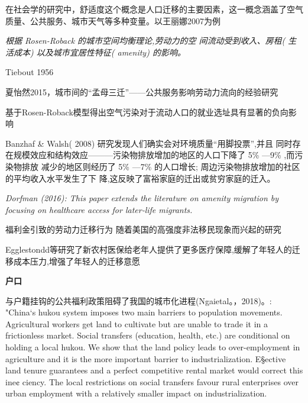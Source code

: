 \documentclass[a4paper,12pt,oneside]{book} %
\begin{document}
在社会学的研究中，舒适度这个概念是人口迁移的主要因素，这一概念涵盖了空气质量、公共服务、城市天气等多种变量。以王丽娜2007为例

\textit{根据 Rosen-Roback 的城市空间均衡理论,劳动力的空 间流动受到收入、房租( 生活成本) 以及城市宜居性特征( amenity) 的影响。}

Tiebout 1956

夏怡然2015，城市间的“孟母三迁”——公共服务影响劳动力流向的经验研究
\cite{XiaYiRanChengShiJianDeMengMuSanQianGongGongFuWuYingXiangLaoDongLiLiuXiangDeJingYanYanJiu2015}

\cite{SunWeiZengKongQiWuRanYuLaoDongLiDeKongJianLiuDongJiYuLiuDongRenKouJiuYeXuanZhiXingWeiDeYanJiu2019}
基于Rosen-Roback模型得出空气污染对于流动人口的就业选址具有显著的负向影响

Banzhaf \& Walsh( 2008) 研究发现人们确实会对环境质量“用脚投票”,并且 同时存在规模效应和结构效应———污染物排放增加的地区的人口下降了 5\% —9\% ,而污染物排放 减少的地区则经历了 5\% —7\% 的人口增长; 周边污染物排放增加的社区的平均收入水平发生了下 降,这反映了富裕家庭的迁出或贫穷家庭的迁入。


\textit{Dorfman (2016): This paper extends the literature on amenity migration by focusing on healthcare access for later‐life migrants.}


福利金引致的劳动力迁移行为
\cite{benjaminImportingPoorWelfare2004}
\cite{mckinnishWelfareinducedMigrationState2007}
随着美国的高强度非法移民现象而兴起的研究

Egglestondd等研究了新农村医保给老年人提供了更多医疗保障,缓解了年轻人的迁移成本压力,增强了年轻人的迁移意愿







\textbf{户口}

与户籍挂钩的公共福利政策阻碍了我国的城市化进程(Ngaietal。，2018)。\cite{ngaiChinasMobilityBarriers2019}: "China‘s hukou system imposes two main barriers to population movements. Agricultural workers get land to cultivate but are unable to trade it in a frictionless market. Social transfers (education, health, etc.) are conditional on holding a local hukou. We show that the land policy leads to over-employment in agriculture and it is the more important barrier to industrialization. E§ective land tenure guarantees and a perfect competitive rental market would correct this ine¢ ciency. The local restrictions on social transfers favour rural enterprises over urban employment with a relatively smaller impact on industrialization.
\end{document}
